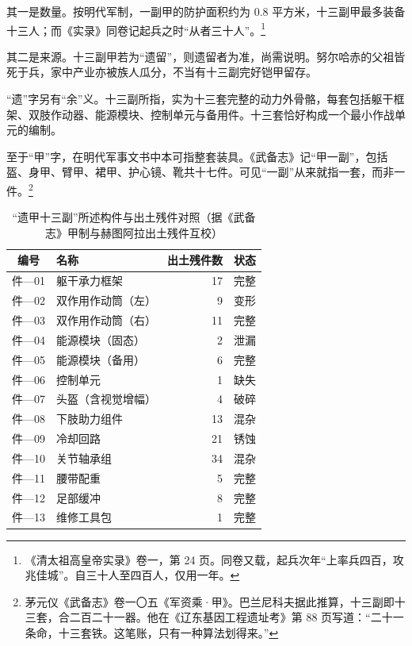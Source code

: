 其一是数量。按明代军制，一副甲的防护面积约为 0.8 平方米，十三副甲最多装备十三人；而《实录》同卷记起兵之时“从者三十人”。\footnote{《清太祖高皇帝实录》卷一，第 24 页。同卷又载，起兵次年“上率兵四百，攻兆佳城”。自三十人至四百人，仅用一年。}

其二是来源。十三副甲若为“遗留”，则遗留者为准，尚需说明。努尔哈赤的父祖皆死于兵，家中产业亦被族人瓜分，不当有十三副完好铠甲留存。

“遗”字另有“余”义。十三副所指，实为十三套完整的动力外骨骼，每套包括躯干框架、双肢作动器、能源模块、控制单元与备用件。十三套恰好构成一个最小作战单元的编制。

至于“甲”字，在明代军事文书中本可指整套装具。《武备志》记“甲一副”，包括盔、身甲、臂甲、裙甲、护心镜、靴共十七件。可见“一副”从来就指一套，而非一件。\footnote{茅元仪《武备志》卷一〇五《军资乘·甲》。巴兰尼科夫据此推算，十三副即十三套，合二百二十一器。他在《辽东基因工程遗址考》第 88 页写道：“二十一条命，十三套铁。这笔账，只有一种算法划得来。”}

\begin{table}[htbp]
\centering
\caption{“遗甲十三副”所述构件与出土残件对照（据《武备志》甲制与赫图阿拉出土残件互校）}
\label{tab:armor}
\footnotesize
\begin{tabular}{@{}clrl@{}}
\toprule
\textbf{编号} & \textbf{名称} & \textbf{出土残件数} & \textbf{状态}\\
\midrule
件—01 & 躯干承力框架 & 17 & 完整\\
件—02 & 双作用作动筒（左） & 9 & 变形\\
件—03 & 双作用作动筒（右） & 11 & 完整\\
件—04 & 能源模块（固态） & 2 & 泄漏\\
件—05 & 能源模块（备用） & 6 & 完整\\
件—06 & 控制单元 & 1 & 缺失\\
件—07 & 头盔（含视觉增幅） & 4 & 破碎\\
件—08 & 下肢助力组件 & 13 & 混杂\\
件—09 & 冷却回路 & 21 & 锈蚀\\
件—10 & 关节轴承组 & 34 & 混杂\\
件—11 & 腰带配重 & 5 & 完整\\
件—12 & 足部缓冲 & 8 & 完整\\
件—13 & 维修工具包 & 1 & 完整\\
\bottomrule
\end{tabular}
\end{table}

